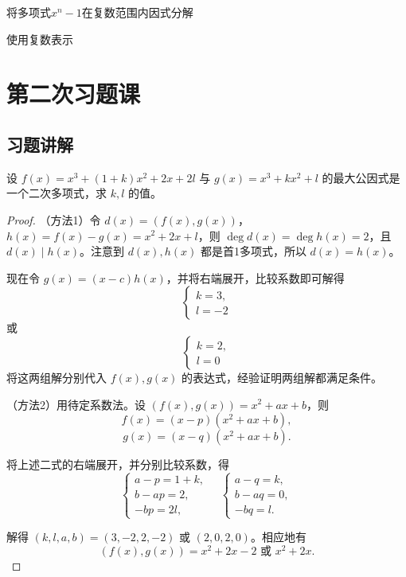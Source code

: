 \documentclass[lang=cn,12pt]{elegantbook}
\begin{document}
\begin{example}
    将多项式$x^n-1$在复数范围内因式分解
\end{example}

\begin{solution}
    使用复数表示
\end{solution}
\chapter{第二次习题课}

\section{习题讲解}

\begin{example}
设 \( f(x)=x^3+(1+k)x^2+2x+2l \) 与 \( g(x)=x^3+kx^2+l \) 的最大公因式是一个二次多项式，求 \( k,l \) 的值。
\end{example}

\begin{proof}
（方法1）令 \( d(x)=(f(x),g(x)) \)，\( h(x)=f(x)-g(x)=x^2+2x+l \)，则 \( \deg d(x)=\deg h(x)=2 \)，且 \( d(x)\mid h(x) \)。注意到 \( d(x),h(x) \) 都是首1多项式，所以 \( d(x)=h(x) \)。

现在令 \( g(x)=(x-c)h(x) \)，并将右端展开，比较系数即可解得
\[\begin{cases}
k=3, \\
l=-2
\end{cases}\]
或
\[\begin{cases}
k=2, \\
l=0
\end{cases}\]
将这两组解分别代入 \( f(x),g(x) \) 的表达式，经验证明两组解都满足条件。

（方法2）用待定系数法。设 \( (f(x),g(x))=x^2+ax+b \)，则
\[f(x)=(x-p)(x^2+ax+b),\]
\[g(x)=(x-q)(x^2+ax+b).\]

将上述二式的右端展开，并分别比较系数，得
\[\begin{cases}
a-p=1+k, \\
b-ap=2, \\
-bp=2l,
\end{cases}
\quad \begin{cases}
a-q=k, \\
b-aq=0, \\
-bq=l.
\end{cases}\]

解得 \( (k,l,a,b)=(3,-2,2,-2) \) 或 \( (2,0,2,0) \)。相应地有
\[(f(x),g(x))=x^2+2x-2 \text{ 或 } x^2+2x.\]
\end{proof}
\end{document}

